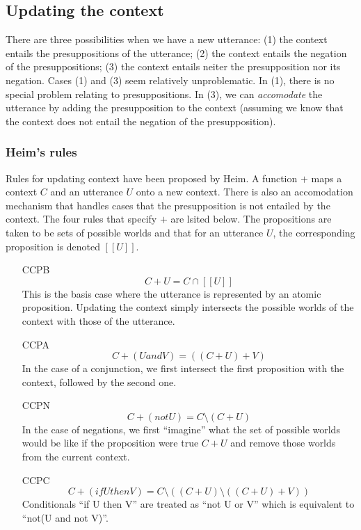 \documentclass{article}
\begin{document}
\subsection{Updating the context}

There are three possibilities when we have a new utterance: (1) the
context entails the presuppositions of the utterance; (2) the context
entails the negation of the presuppositions; (3) the context entails
neiter the presupposition nor its negation. Cases (1) and (3) seem
relatively unproblematic. In (1), there is no special problem relating
to presuppositions. In (3), we can {\em accomodate} the utterance by
adding the presupposition to the context (assuming we know that the
context does not entail the negation of the presupposition). 

\subsubsection{Heim's rules}

Rules for updating context have been proposed by Heim\cite{}. A
function $+$ maps a context $C$ and an utterance $U$ onto a new
context. There is also an accomodation mechanism that handles cases
that the presupposition is not entailed by the context. The four rules
that specify $+$ are lsited below. The propositions are taken to be
sets of possible worlds and that for an utterance $U$, the
corresponding proposition is denoted $[[U]]$. 

\begin{itemize}
\item[CCPB] 
\[C + U = C \cap [[U]] \]
This is the basis case where the utterance is represented by an atomic
proposition. Updating the context simply intersects the possible
worlds of the context with those of the utterance.
\item[CCPA]
\[ C + (U and V) = ((C + U) + V) \]
In the case of a conjunction, we first intersect the first proposition
with the context, followed by the second one.
\item[CCPN]
\[ C + (not U) = C \setminus (C + U) \]
In the case of negations, we first ``imagine'' what the set of
possible worlds would be like if the proposition were true $C + U$ and
remove those worlds from the current context.
\item[CCPC]
\[ C + (if U then V) = C \setminus ((C + U) \setminus ((C + U) + V))
\]
Conditionals ``if U then V'' are treated as ``not U or V'' which is
equivalent to ``not(U and not V)''. 
\end{itemize}
\end{document}

